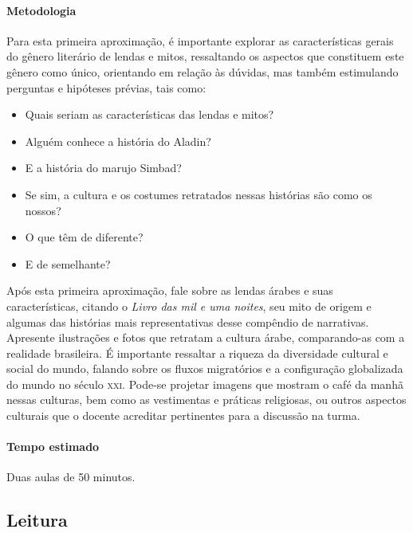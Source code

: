 \documentclass[11pt]{extarticle}
\begin{document}
\paragraph{Metodologia} Para esta primeira aproximação, é importante explorar as características gerais do gênero literário de lendas e mitos, ressaltando os aspectos que constituem este gênero como único, orientando em relação às dúvidas, mas também estimulando perguntas e hipóteses prévias, tais como:

\begin{itemize}
\item Quais seriam as características das lendas e mitos?
\item Alguém conhece a história do Aladin?
\item E a história do marujo Simbad?
\item Se sim, a cultura e os costumes retratados nessas histórias são como os nossos?
\item O que têm de diferente? 
\item E de semelhante?
\end{itemize}

Após esta primeira aproximação, fale sobre as lendas árabes e suas características, citando o \textit{Livro das mil e uma noites}, seu mito de origem e algumas das histórias mais representativas desse compêndio de narrativas. Apresente ilustrações e fotos que retratam a cultura árabe, comparando-as com a realidade brasileira. É importante ressaltar a riqueza da diversidade cultural e social do mundo, falando sobre os fluxos migratórios e a configuração globalizada do mundo no século \textsc{xxi}. Pode-se projetar imagens que mostram o café da manhã nessas culturas, bem como as vestimentas e práticas religiosas, ou outros aspectos culturais que o docente acreditar pertinentes para a discussão na turma.

\paragraph{Tempo estimado} Duas aulas de 50 minutos.



\subsection{Leitura}
\end{document}
